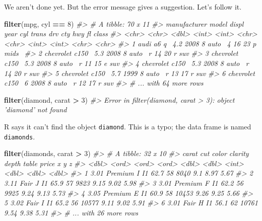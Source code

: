\documentclass[]{book}
\newenvironment{Shaded}{\begin{snugshade}}{\end{snugshade}}
\newcommand{\CommentTok}[1]{\textcolor[rgb]{0.56,0.35,0.01}{\textit{#1}}}
\newcommand{\DecValTok}[1]{\textcolor[rgb]{0.00,0.00,0.81}{#1}}
\newcommand{\KeywordTok}[1]{\textcolor[rgb]{0.13,0.29,0.53}{\textbf{#1}}}
\newcommand{\NormalTok}[1]{#1}
\newcommand{\OperatorTok}[1]{\textcolor[rgb]{0.81,0.36,0.00}{\textbf{#1}}}
\newcommand{\StringTok}[1]{\textcolor[rgb]{0.31,0.60,0.02}{#1}}
\theoremstyle{plain}
\theoremstyle{remark}
\begin{document}
We aren't done yet. But the error message gives a suggestion. Let's
follow it.

\begin{Shaded}
\begin{Highlighting}[]
\KeywordTok{filter}\NormalTok{(mpg, cyl }\OperatorTok{==}\StringTok{ }\DecValTok{8}\NormalTok{)}
\CommentTok{#> # A tibble: 70 x 11}
\CommentTok{#>   manufacturer model displ  year   cyl trans drv     cty   hwy fl    class}
\CommentTok{#>   <chr>        <chr> <dbl> <int> <int> <chr> <chr> <int> <int> <chr> <chr>}
\CommentTok{#> 1 audi         a6 q~   4.2  2008     8 auto~ 4        16    23 p     mids~}
\CommentTok{#> 2 chevrolet    c150~   5.3  2008     8 auto~ r        14    20 r     suv  }
\CommentTok{#> 3 chevrolet    c150~   5.3  2008     8 auto~ r        11    15 e     suv  }
\CommentTok{#> 4 chevrolet    c150~   5.3  2008     8 auto~ r        14    20 r     suv  }
\CommentTok{#> 5 chevrolet    c150~   5.7  1999     8 auto~ r        13    17 r     suv  }
\CommentTok{#> 6 chevrolet    c150~   6    2008     8 auto~ r        12    17 r     suv  }
\CommentTok{#> # ... with 64 more rows}
\end{Highlighting}
\end{Shaded}

\begin{Shaded}
\begin{Highlighting}[]
\KeywordTok{filter}\NormalTok{(diamond, carat }\OperatorTok{>}\StringTok{ }\DecValTok{3}\NormalTok{)}
\CommentTok{#> Error in filter(diamond, carat > 3): object 'diamond' not found}
\end{Highlighting}
\end{Shaded}

R says it can't find the object \texttt{diamond}. This is a typo; the
data frame is named \texttt{diamonds}.

\begin{Shaded}
\begin{Highlighting}[]
\KeywordTok{filter}\NormalTok{(diamonds, carat }\OperatorTok{>}\StringTok{ }\DecValTok{3}\NormalTok{)}
\CommentTok{#> # A tibble: 32 x 10}
\CommentTok{#>   carat cut     color clarity depth table price     x     y     z}
\CommentTok{#>   <dbl> <ord>   <ord> <ord>   <dbl> <dbl> <int> <dbl> <dbl> <dbl>}
\CommentTok{#> 1  3.01 Premium I     I1       62.7    58  8040  9.1   8.97  5.67}
\CommentTok{#> 2  3.11 Fair    J     I1       65.9    57  9823  9.15  9.02  5.98}
\CommentTok{#> 3  3.01 Premium F     I1       62.2    56  9925  9.24  9.13  5.73}
\CommentTok{#> 4  3.05 Premium E     I1       60.9    58 10453  9.26  9.25  5.66}
\CommentTok{#> 5  3.02 Fair    I     I1       65.2    56 10577  9.11  9.02  5.91}
\CommentTok{#> 6  3.01 Fair    H     I1       56.1    62 10761  9.54  9.38  5.31}
\CommentTok{#> # ... with 26 more rows}
\end{Highlighting}
\end{Shaded}
\end{document}
